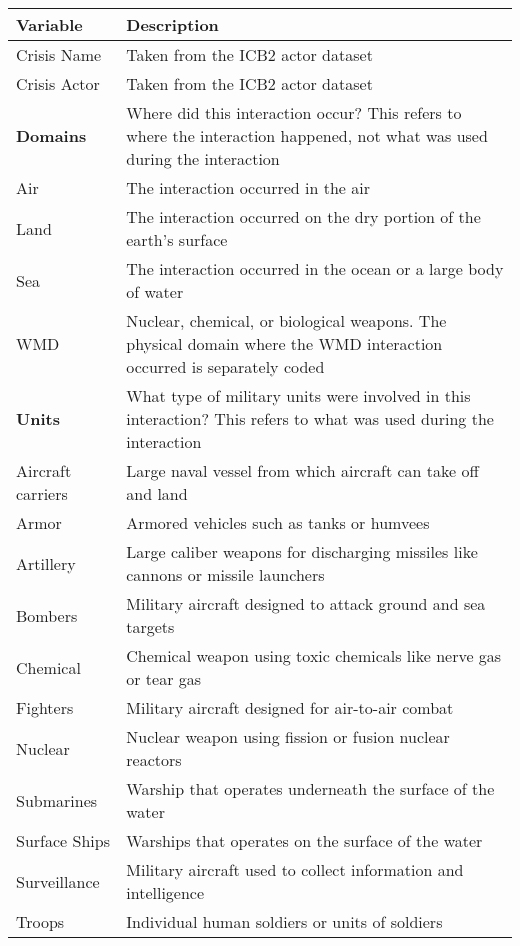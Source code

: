 \documentclass[12pt,letterpaper]{article}
\begin{document}
\begin{table}[h]
	\centering
	\begin{tabular}{|l|p{14cm}|}
		\hline
		\textbf{Variable} & \textbf{Description} \\ 
		\hline
		\hline
		Crisis Name & Taken from the ICB2 actor dataset \\
		Crisis Actor & Taken from the ICB2 actor dataset \\
		\hline
		\textbf{Domains} & Where did this interaction occur? This refers to where the interaction happened, not what was used during the interaction \\
		Air &  The interaction occurred in the air \\
		Land & The interaction occurred on the dry portion of the earth's surface \\
		Sea & The interaction occurred in the ocean or a large body of water \\
		WMD & Nuclear, chemical, or biological weapons. The physical domain where the WMD interaction occurred is separately coded \\
		\hline
		\textbf{Units} & What type of military units were involved in this interaction? This refers to what was used during the interaction \\
		Aircraft carriers & Large naval vessel from which aircraft can take off and land \\
		Armor & Armored vehicles such as tanks or humvees \\
		Artillery & Large caliber weapons for discharging missiles like cannons or missile launchers \\
		Bombers & Military aircraft designed to attack ground and sea targets \\
		Chemical & Chemical weapon using toxic chemicals like nerve gas or tear gas \\
		Fighters & Military aircraft designed for air-to-air combat \\
		Nuclear & Nuclear weapon using fission or fusion nuclear reactors \\
		Submarines & Warship that operates underneath the surface of the water \\
		Surface Ships & Warships that operates on the surface of the water \\
		Surveillance & Military aircraft used to collect information and intelligence \\
		Troops & Individual human soldiers or units of soldiers \\
		\hline
	\end{tabular}
	\label{tab:variable_summary}
\end{table}
\end{document}
